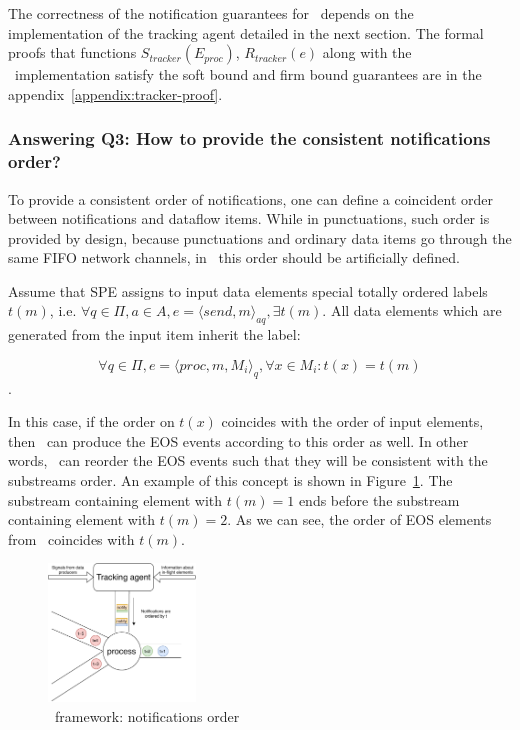 The correctness of the notification guarantees for \tracker\ depends on the implementation of the tracking agent detailed in the next section. The formal proofs that functions $S_{tracker}(E_{proc})$, $R_{tracker}(e)$ along with the \tracker\ implementation satisfy the soft bound and firm bound guarantees are in the appendix~\ref{appendix:tracker-proof}.

\subsubsection{Answering Q3: How to provide the consistent notifications order?}
To provide a consistent order of notifications, one can define a coincident order between notifications and dataflow items. While in punctuations, such order is provided by design, because punctuations and ordinary data items go through the same FIFO network channels, in \tracker\, this order should be artificially defined.

Assume that SPE assigns to input data elements special totally ordered labels $t(m)$, i.e. $\forall q\in \Pi,a\in A, e=\langle send,m\rangle_{aq}, \exists t(m)$. All data elements which are generated from the input item inherit the label: 

$$\forall q\in \Pi, e=\langle proc,m,M_i\rangle_q, \forall x \in M_i : t(x) = t(m)$$.

In this case, if the order on $t(x)$ coincides with the order of input elements, then \tracker\ can produce the EOS events according to this order as well. In other words, \tracker\ can reorder the EOS events such that they will be consistent with the substreams order. An example of this concept is shown in Figure~\ref{tracker_ordering}. The substream containing element with $t(m)=1$ ends before the substream containing element with $t(m)=2$. As we can see, the order of EOS elements from \tracker\ coincides with $t(m)$.

\begin{figure}[htbp]
  \centering
  \includegraphics[width=0.35\textwidth]{pics/tracker-ordering.pdf}
  \caption{\tracker\ framework: notifications order}
  \label{tracker_ordering}
\end{figure}

